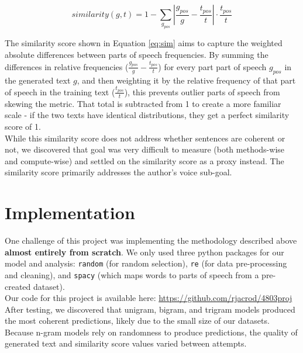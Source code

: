 \documentclass[11pt]{article}
\newcommand{\blue}[1]{\textcolor{blue}{#1}}
\begin{document}
\begin{equation}
\label{eq:sim}
similarity(g,t)= 1- \sum_{g_{pos}} |\frac{g_{pos}}{g}-\frac{t_{pos}}{t}| \cdot \frac{t_{pos}}{t}
\end{equation} \vspace{0.1em}

The similarity score shown in Equation \ref{eq:sim} aims to capture the weighted absolute differences between parts of speech frequencies.  By summing the differences in relative frequencies ($\frac{g_{pos}}{g} - \frac{t_{pos}}{t}$) for every part part of speech $g_{pos}$ in the generated text $g$, and then weighting it by the relative frequency of that part of speech in the training text ($\frac{t_{pos}}{t}$), this prevents outlier parts of speech from skewing the metric.  That total is subtracted from 1 to create a more familiar scale - if the two texts have identical distributions, they get a perfect similarity score of 1.\\

While this similarity score does not address whether sentences are coherent or not, we discovered that goal was very difficult to measure (both methods-wise and compute-wise) and settled on the similarity score as a proxy instead.  The similarity score primarily addresses the author's voice sub-goal.

\newpage
\section{Implementation}
\label{ref:implement}

One challenge of this project was implementing the methodology described above \textbf{almost entirely from scratch}.  We only used three python packages for our model and analysis: \texttt{random} (for random selection), \texttt{re} (for data pre-processing and cleaning), and \texttt{spacy} (which maps words to parts of speech from a pre-created dataset).\\

Our code for this project is available here: \blue{\href{https://github.com/rjacrod/4803proj}{https://github.com/rjacrod/4803proj}}\\

After testing, we discovered that unigram, bigram, and trigram models produced the most coherent predictions, likely due to the small size of our datasets. Because n-gram models rely on randomness to produce predictions, the quality of generated text and similarity score values varied between attempts.\\
\end{document}
